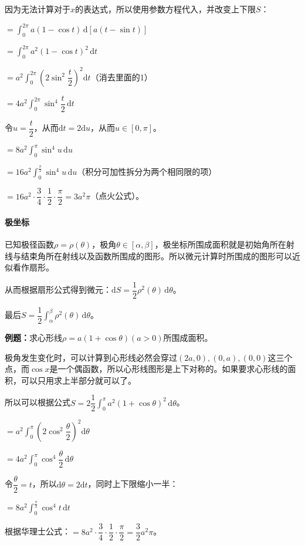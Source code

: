 \documentclass[UTF8, 12pt]{ctexart}
\begin{document}
因为无法计算对于$x$的表达式，所以使用参数方程代入，并改变上下限$S$：

$=\int_0^{2\pi}a(1-\cos t)\,\textrm{d}[a(t-\sin t)]$

$=\int_0^{2\pi}a^2(1-\cos t)^2\,\textrm{d}t$

$=a^2\displaystyle{\int_0^{2\pi}\left(2\sin^2\dfrac{t}{2}\right)^2\textrm{d}t}$（消去里面的1）

$=4a^2\displaystyle{\int_0^{2\pi}\sin^4\dfrac{t}{2}\,\textrm{d}t}$

令$u=\dfrac{t}{2}$，从而$\textrm{d}t=2\textrm{d}u$，从而$u\in[0,\pi]$。

$=8a^2\int_0^\pi\sin^4u\,\textrm{d}u$

$=16a^2\int_0^{\frac{\pi}{2}}\sin^4u\,\textrm{d}u$（积分可加性拆分为两个相同限的项）

$=16a^2\cdot\dfrac{3}{4}\cdot\dfrac{1}{2}\cdot\dfrac{\pi}{2}=3a^2\pi$（点火公式）。

\paragraph{极坐标}  \leavevmode \medskip

已知极径函数$\rho=\rho(\theta)$，极角$\theta\in[\alpha,\beta]$，极坐标所围成面积就是初始角所在射线与结束角所在射线以及函数所围成的图形。所以微元计算时所围成的图形可以近似看作扇形。

从而根据扇形公式得到微元：$\textrm{d}S=\dfrac{1}{2}\rho^2(\theta)\,\textrm{d}\theta$。

最后$S=\dfrac{1}{2}\int_\alpha^\beta\rho^2(\theta)\,\textrm{d}\theta$。

\textbf{例题：}求心形线$\rho=a(1+\cos\theta)(a>0)$所围成面积。

极角发生变化时，可以计算到心形线必然会穿过$(2a,0),(0,a),(0,0)$这三个点，而$\cos x$是一个偶函数，所以心形线图形是上下对称的。如果要求心形线的面积，可以只用求上半部分就可以了。

所以可以根据公式$S=2\dfrac{1}{2}\int_0^\pi a^2(1+\cos\theta)^2\,\textrm{d}\theta$。

$=a^2\displaystyle{\int_0^\pi\left(2\cos^2\dfrac{\theta}{2}\right)^2\textrm{d}\theta}$

$=4a^2\displaystyle{\int_0^\pi\cos^4\dfrac{\theta}{2}\,\textrm{d}\theta}$

令$\dfrac{\theta}{2}=t$，所以$\textrm{d}\theta=2\textrm{d}t$，同时上下限缩小一半：

$=8a^2\int_0^{\frac{\pi}{2}}\cos^4t\,\textrm{d}t$

根据华理士公式：$=8a^2\cdot\dfrac{3}{4}\cdot\dfrac{1}{2}\cdot\dfrac{\pi}{2}=\dfrac{3}{2}a^2\pi$。
\end{document}
